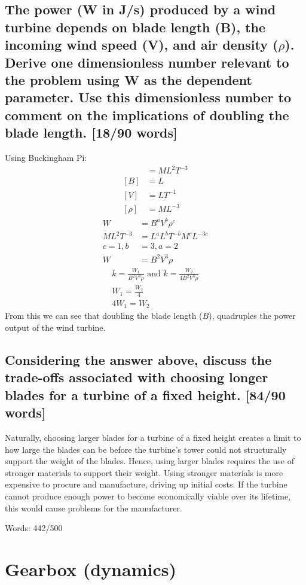 \documentclass[12pt]{article}
\numberwithin{equation}{section}
\begin{document}
\begin{flushleft}
\subsection{The power (W in J/s) produced by a wind turbine depends on blade length (B), the incoming wind speed (V), and air density (\(\rho\)). Derive one dimensionless number relevant to the problem using W as the dependent parameter. Use this dimensionless number to comment on the implications of doubling the blade length. [18/90 words]}
Using Buckingham Pi:
\begin{align}
  [W] &= ML^2T^{-3}\\
  [B] &= L\\
  [V] &= LT^{-1}\\
  [\rho] &= ML^{-3}
\end{align}
\begin{align}
  W &= B^a V^b \rho^c\\
  ML^2T^{-3} &= L^a L^b T^{-b} M^c L^{-3c}\\
  c = 1, b &= 3, a = 2\\
  W &= B^2 V^3 \rho
\end{align}
\begin{gather}
  k = \frac{W_1}{B^2 V^3 \rho} \textrm{ and } k = \frac{W_2}{4B^2 V^3 \rho}\\
  W_1 = \frac{W_2}{4} \\
  4W_1 = W_2
\end{gather}
From this we can see that doubling the blade length (\(B\)), quadruples the power output of the wind turbine.

\subsection{Considering the answer above, discuss the trade-offs associated with choosing longer blades for a turbine of a fixed height. [84/90 words]}
Naturally, choosing larger blades for a turbine of a fixed height creates a limit to how large the blades can be before the turbine’s tower could not structurally support the weight of the blades. Hence, using larger blades requires the use of stronger materials to support their weight. Using stronger materials is more expensive to procure and manufacture, driving up initial costs. If the turbine cannot produce enough power to become economically viable over its lifetime, this would cause problems for the manufacturer.

Words: 442/500

\section{Gearbox (dynamics)}

\end{flushleft}
\end{document}

